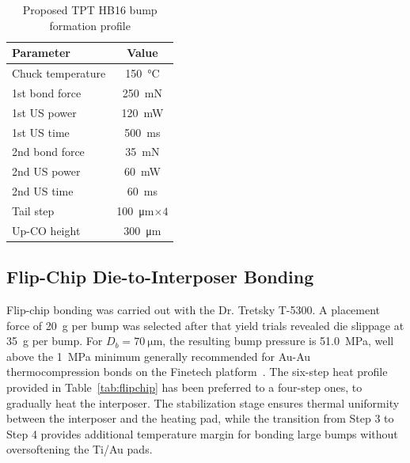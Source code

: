 \documentclass[conference,a4paper]{IEEEtran}
\begin{document}
\begin{table}[htbp]
    \caption{Proposed TPT HB16 bump formation profile} \label{tab:bump_param}
    \centering
    \begin{tabular}{|l|c|}
        \hline
        \textbf{Parameter}  & \textbf{Value} \\ \hline
        Chuck temperature   & \SI{150}{\celsius} \\
        1st bond force      & \SI{250}{mN} \\
        1st US power        & \SI{120}{mW} \\
        1st US time         & \SI{500}{ms} \\
        2nd bond force      & \SI{35}{mN} \\
        2nd US power        & \SI{60}{mW} \\
        2nd US time         & \SI{60}{ms} \\
        Tail step           & \SI{100}{\micro\metre}\(\times4\)\\
        Up-CO height        & \SI{300}{\micro\metre} \\ \hline
    \end{tabular}
\end{table}

\subsection{Flip-Chip Die-to-Interposer Bonding}\label{subsec:flipchip}
Flip-chip bonding was carried out with the Dr. Tretsky T-5300. A
placement force of \SI{20}{g} per bump was selected after that yield trials revealed
die slippage at \SI{35}{g} per bump.  For \(D_b=\SI{70}{\micro\metre}\), the resulting bump pressure is \SI{51.0}{\MPa}, well above the \SI{1}{MPa} minimum generally recommended for Au-Au thermocompression bonds on the Finetech platform~\cite{Deng2016}. The six-step heat profile provided in Table~\ref{tab:flipchip} has been preferred to a four-step ones, to gradually heat the interposer. The stabilization stage ensures thermal uniformity between the interposer and the heating pad, while the transition from Step 3 to Step 4 provides additional temperature margin for bonding large bumps without oversoftening the Ti/Au pads.
\end{document}
